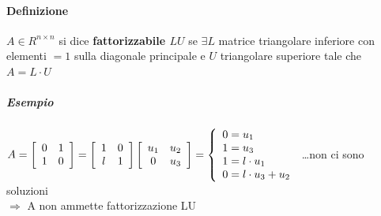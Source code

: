 \documentclass[10pt]{book}
\begin{document}
\paragraph{Definizione} $A \in R^{n \times n}$ si dice \textbf{fattorizzabile $LU$} se $\exists L$ matrice triangolare inferiore con elementi $= 1$ sulla diagonale principale e $U$ triangolare superiore tale che $A = L\cdot U$
\subparagraph{Esempio} \begin{math}
A = \left[
\begin{array}{c c}
	0 & 1\\
	1 & 0
\end{array}
\right]
= \left[
\begin{array}{c c}
	1 & 0\\
	l & 1
\end{array}
\right]
\left[
\begin{array}{c c}
	u_1 & u_2\\
	0 & u_3
\end{array}
\right]
= \left\{
\begin{array}{l}
	0 = u_1\\
	1 = u_3\\
	1 = l\cdot u_1\\
	0 = l\cdot u_3 + u_2
\end{array}
\right.
\end{math}
\ldots non ci sono soluzioni\\
$\Rightarrow$ A non ammette fattorizzazione LU
\pagebreak
\end{document}
